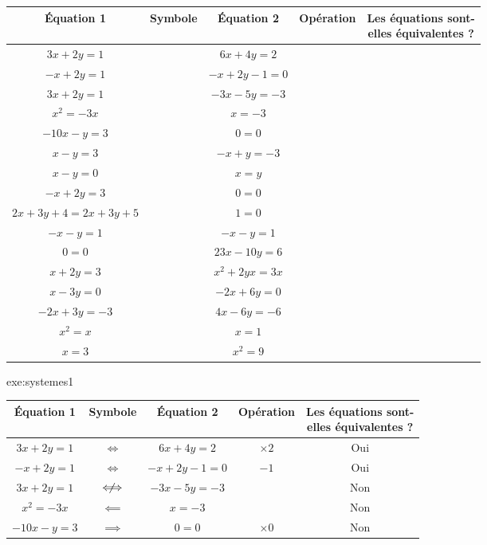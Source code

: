 {	\begin{center}
	\begin{tabular}{ccc|c|c}
		Équation 1 & Symbole & Équation 2 & Opération & \thead{Les équations sont-\\ elles équivalentes ?} \\ \hline
		$3x + 2y = 1$ &  & $6x  + 4y = 2$ & &  \\ \hline
		$-x + 2y = 1$ &  & $-x + 2y - 1 = 0$ & &  \\ \hline
		$3x + 2y = 1$ & & $-3x - 5y = -3$ & &  \\ \hline
		$x^2 = -3x$ &  & $x = -3$ & &  \\ \hline
		$-10x - y = 3$ &  & $0=0$ & &  \\ \hline
		$x-y= 3$ & & $-x + y = -3$ & &  \\ \hline
		$x -y = 0$ & & $x=y$ & &  \\ \hline
		$-x + 2y = 3$ & & $0=0$ & &  \\ \hline
		$2x + 3y + 4 = 2x + 3y + 5$ & & $1=0$ & &  \\ \hline
		$-x - y = 1$ & & $-x - y = 1$ & &  \\ \hline
		$0=0$ & & $23x - 10y = 6$ & &  \\ \hline
		$x + 2y = 3$ & & $x^2 + 2yx = 3x$ & &  \\ \hline
		$x-3y  =0$ & & $-2x+6y = 0$ & &  \\ \hline
		$-2x + 3y = -3$ & & $4x - 6y = -6$ & &  \\ \hline
		$x^2 = x$ & & $x = 1$ & &  \\ \hline
		$x = 3$ & & $x^2 = 9$ & &  \\ \hline
	\end{tabular}
	\end{center}
}{exe:systemes1}{
	\begin{center}
	\begin{tabular}{ccc|c|c}
		Équation 1 & Symbole & Équation 2 & Opération & \thead{Les équations sont-\\ elles équivalentes ?} \\ \hline
		$3x + 2y = 1$ & {$\iff$} & $6x  + 4y = 2$ & {$\times2$} & {Oui} \\ \hline
		$-x + 2y = 1$ & {$\iff$} & $-x + 2y - 1 = 0$ & {$-1$} & {Oui} \\ \hline
		$3x + 2y = 1$ & {$\centernot\iff$} & $-3x - 5y = -3$ & & {Non} \\ \hline
		$x^2 = -3x$ & {$\impliedby$} & $x = -3$ & & {Non} \\ \hline
		$-10x - y = 3$ & {$\implies$} & $0=0$ & {$\times0$} & {Non} \\ \hline

\end{tabular}
\end{center}}
